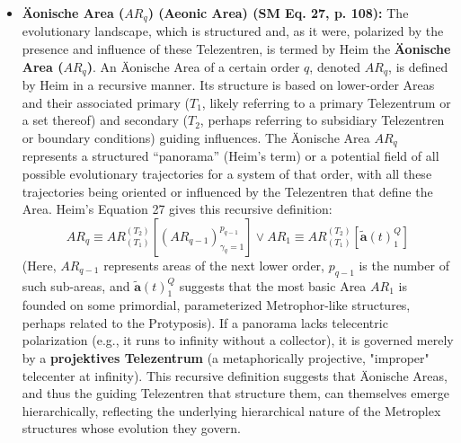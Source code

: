 \documentclass[12pt]{article}
\newcommand{\q}[1]{\enquote{#1}}
\newcommand{\metrophor}{\bm{\widetilde{a}}}
\newcommand{\aeonischearea}{AR_q}
\begin{document}
\begin{itemize}
    \item \textbf{\"{A}onische Area (\( \aeonischearea \)) (Aeonic Area) (SM Eq. 27, p. 108):}
    The evolutionary landscape, which is structured and, as it were, polarized by the presence and influence of these Telezentren, is termed by Heim the \textbf{\"{A}onische Area (\(\aeonischearea\))}. An Äonische Area of a certain order \( q \), denoted \( \aeonischearea \), is defined by Heim in a recursive manner. Its structure is based on lower-order Areas and their associated primary (\( T_1 \), likely referring to a primary Telezentrum or a set thereof) and secondary (\( T_2 \), perhaps referring to subsidiary Telezentren or boundary conditions) guiding influences. The Äonische Area \( \aeonischearea \) represents a structured \q{panorama} (Heim's term) or a potential field of all possible evolutionary trajectories for a system of that order, with all these trajectories being oriented or influenced by the Telezentren that define the Area. Heim's Equation 27 gives this recursive definition:
    \begin{equation}
    \aeonischearea \equiv AR_{(T_1)}^{(T_2)} [(AR_{q-1})_{\gamma_q=1}^{p_{q-1}}] \vee AR_1 \equiv AR_{(T_1)}^{(T_2)} [\metrophor(t)_1^Q]
    \label{eq:original_aeonische_area}
    \end{equation}
    (Here, \(AR_{q-1}\) represents areas of the next lower order, \(p_{q-1}\) is the number of such sub-areas, and \( \metrophor(t)_1^Q \) suggests that the most basic Area \(AR_1\) is founded on some primordial, parameterized Metrophor-like structures, perhaps related to the Protyposis). If a panorama lacks telecentric polarization (e.g., it runs to infinity without a collector), it is governed merely by a \textbf{projektives Telezentrum} (a metaphorically projective, "improper" telecenter at infinity). This recursive definition suggests that Äonische Areas, and thus the guiding Telezentren that structure them, can themselves emerge hierarchically, reflecting the underlying hierarchical nature of the Metroplex structures whose evolution they govern.


\end{itemize}
\end{document}
